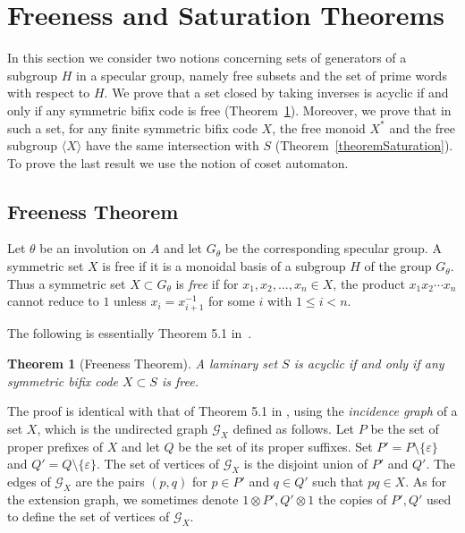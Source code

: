\documentclass[preprint,12pt]{elsarticle}
\newtheorem{theorem}{Theorem}
\newcommand\G{\mathcal{G}}
\numberwithin{theorem}{section}
\numberwithin{equation}{section}
\numberwithin{figure}{section}
\numberwithin{table}{section}
\begin{document}
\section{Freeness and Saturation Theorems}
\label{sec:groups}
In this section we consider two notions concerning sets of generators of a subgroup $H$ in a specular group, namely free subsets and the set of prime words with respect to $H$.
We prove that a set closed by taking inverses is acyclic if and only if any symmetric bifix code is free (Theorem~\ref{theoremFreeness}).
Moreover, we prove that in such a set, for any finite symmetric bifix code $X$, the free monoid $X^*$ and the free subgroup $\langle X \rangle$ have the same intersection with $S$ (Theorem~\ref{theoremSaturation}).
To prove the last result we use the notion of coset automaton.





\subsection{Freeness Theorem}
Let $\theta$ be an involution on $A$ and let $G_\theta$ be the corresponding specular group.
A symmetric set $X$ is free if it is a monoidal basis of a subgroup $H$ of the  group $G_\theta$.
Thus a symmetric set $X\subset G_\theta$ is \emph{free} if for $x_1,x_2,\ldots,x_n\in X$, the product $x_1x_2\cdots x_n$ cannot reduce to $1$ unless $x_i = x_{i+1}^{-1}$ for some $i$ with $1 \leq i<n$.

The following is essentially Theorem 5.1 in~\cite{BertheDeFeliceDolceLeroyPerrinReutenauerRindone2013a}.

\begin{theorem}[Freeness Theorem]
\label{theoremFreeness}
A laminary set $S$ is acyclic if and only if any symmetric bifix code $X\subset S$ is free.
\end{theorem}
The proof is identical with that of Theorem 5.1 in \cite{BertheDeFeliceDolceLeroyPerrinReutenauerRindone2013a}, using the \emph{incidence graph} of a set $X$, which is the undirected graph $\G_X$ defined as follows.
Let $P$ be the set of proper prefixes of $X$ and let $Q$ be the set of its proper suffixes.
Set $P'=P\setminus\{\varepsilon\}$
and $Q'=Q\setminus \{\varepsilon\}$.
The set of vertices of $\G_X$ is the disjoint union of $P'$ and $Q'$.
The edges of $\G_X$ are the pairs $(p,q)$ for $p \in P'$ and $q \in Q'$ such that $pq \in X$.
As for the extension graph, we sometimes denote $1\otimes P',Q'\otimes 1$ the copies of $P',Q'$ used to define the set of vertices of $\G_X$.
\end{document}

